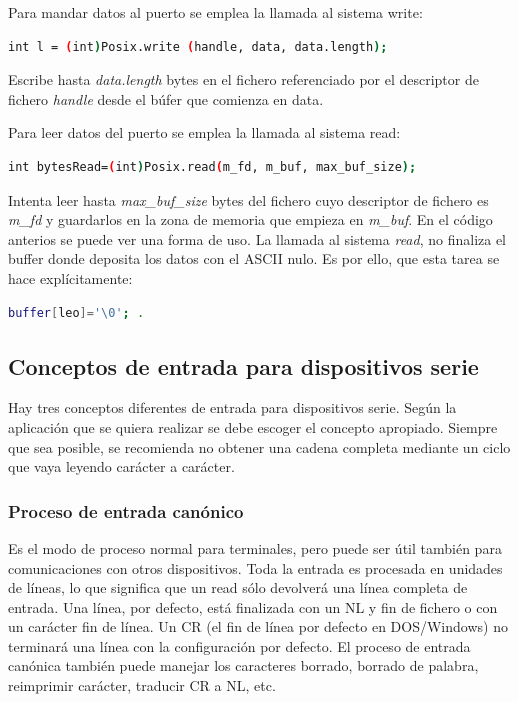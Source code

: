 \documentclass[12pt,twoside]{book}
\begin{document}
Para mandar datos al puerto se emplea la llamada al sistema write:

\begin{lstlisting}[language=bash]
int l = (int)Posix.write (handle, data, data.length);
\end{lstlisting}

Escribe hasta \emph{data.length} bytes en el fichero referenciado por el descriptor de fichero \emph{handle}
desde el búfer que comienza en data.

Para leer datos del puerto se emplea la llamada al sistema read:
\begin{lstlisting}[language=bash]
int bytesRead=(int)Posix.read(m_fd, m_buf, max_buf_size);
\end{lstlisting}

Intenta leer hasta \emph{max\_buf\_size} bytes del fichero cuyo descriptor de fichero es 
\emph{m\_fd} y guardarlos en la zona de memoria que empieza en \emph{m\_buf}. En el código anterios se puede ver una forma de uso. La llamada al sistema \emph{read}, no finaliza el buffer
donde deposita los datos con el ASCII nulo. Es por ello, que esta tarea se hace
explícitamente: 
\begin{lstlisting}[language=bash]
buffer[leo]='\0'; . 
\end{lstlisting}

\subsection{Conceptos de entrada para dispositivos serie}

Hay tres conceptos diferentes de entrada para dispositivos serie. Según la
aplicación que se quiera realizar se debe escoger el concepto apropiado. Siempre
que sea posible, se recomienda no obtener una cadena completa mediante un
ciclo que vaya leyendo carácter a carácter.

\subsubsection{Proceso de entrada canónico}

Es el modo de proceso normal para terminales, pero puede ser útil también para
comunicaciones con otros dispositivos. Toda la entrada es procesada en unidades
de líneas, lo que significa que un read sólo devolverá una línea completa de
entrada. Una línea, por defecto, está finalizada con un NL y fin de fichero o con
un carácter fin de línea. Un CR (el fin de línea por defecto en DOS/Windows) no
terminará una línea con la configuración por defecto.
El proceso de entrada canónica también puede manejar los caracteres borrado,
borrado de palabra, reimprimir carácter, traducir CR a NL, etc.
\end{document}
